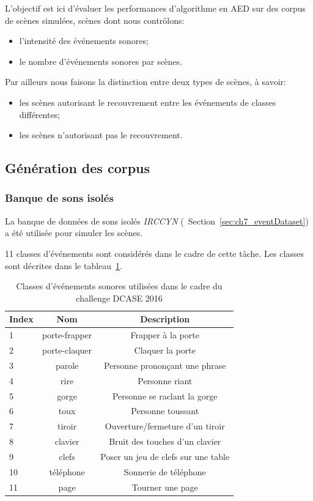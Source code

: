 L'objectif est ici d'évaluer les performances d'algorithme en AED sur des corpus de scènes simulées, scènes dont nous contrôlons:

\begin{itemize}
\item l'intensité des événements sonores;
\item le nombre d'événements sonores par scènes.
\end{itemize}

Par ailleurs nous faisons la distinction entre deux types de scènes, à savoir:

\begin{itemize}
\item les scènes autorisant le recouvrement entre les événements de classes différentes;
\item les scènes n'autorisant pas le recouvrement.
\end{itemize}
\subsection{Génération des corpus}

\subsubsection{Banque de sons isolés}

La banque de données de sons isolés \emph{IRCCYN} (\cf~Section~\ref{sec:ch7_eventDataset}) a été utilisée pour simuler les scènes.

11 classes d'événements sont considérés dans le cadre de cette tâche. Les classes sont décrites dans le tableau~\ref{tab:eventDCASE2016}.

\begin{table}[t]
\begin{center}
\begin{tabular}{lcc}
\textbf{Index} & \textbf{Nom}  & \textbf{Description}  \\ 
\hline
1   & porte-frapper & Frapper à la porte \\
2   & porte-claquer & Claquer la porte \\
3   & parole        & Personne  prononçant une phrase \\
4   & rire          & Personne riant  \\    
5   & gorge         & Personne se raclant la gorge  \\
6   & toux          & Personne toussant \\
7   & tiroir        & Ouverture/fermeture d'un tiroir \\
8   & clavier       & Bruit des touches d'un clavier \\
9   & clefs         & Poser un jeu de clefs sur une table \\    
10  & téléphone     & Sonnerie de téléphone \\
11  & page          & Tourner une page \\     
\hline      
\end{tabular}
\end{center}
\caption{Classes d'événements sonores utilisées dans le cadre du challenge DCASE 2016}
\label{tab:eventDCASE2016}
\end{table}

